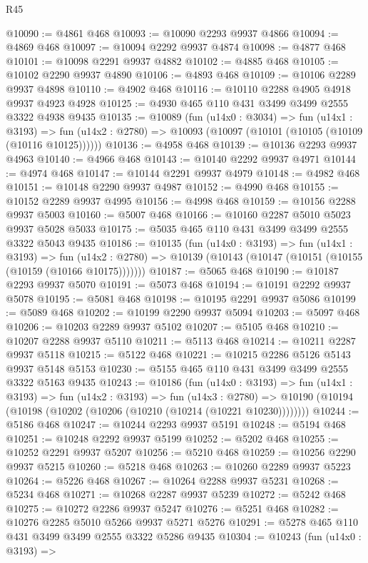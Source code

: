 \begin{lexlean}{R45}
\begin{coremodule}
@10090 := @4861 @468
@10093 := @10090 @2293 @9937 @4866
@10094 := @4869 @468
@10097 := @10094 @2292 @9937 @4874
@10098 := @4877 @468
@10101 := @10098 @2291 @9937 @4882
@10102 := @4885 @468
@10105 := @10102 @2290 @9937 @4890
@10106 := @4893 @468
@10109 := @10106 @2289 @9937 @4898
@10110 := @4902 @468
@10116 := @10110 @2288 @4905 @4918 @9937 @4923 @4928
@10125 := @4930 @465 @110 @431 @3499 @3499 @2555 @3322 @4938 @9435
@10135 := @10089
    (fun (u14x0 : @3034) =>
    fun (u14x1 : @3193) =>
    fun (u14x2 : @2780) => @10093 (@10097 (@10101 (@10105 (@10109 (@10116 @10125))))))
@10136 := @4958 @468
@10139 := @10136 @2293 @9937 @4963
@10140 := @4966 @468
@10143 := @10140 @2292 @9937 @4971
@10144 := @4974 @468
@10147 := @10144 @2291 @9937 @4979
@10148 := @4982 @468
@10151 := @10148 @2290 @9937 @4987
@10152 := @4990 @468
@10155 := @10152 @2289 @9937 @4995
@10156 := @4998 @468
@10159 := @10156 @2288 @9937 @5003
@10160 := @5007 @468
@10166 := @10160 @2287 @5010 @5023 @9937 @5028 @5033
@10175 := @5035 @465 @110 @431 @3499 @3499 @2555 @3322 @5043 @9435
@10186 := @10135
    (fun (u14x0 : @3193) =>
    fun (u14x1 : @3193) =>
    fun (u14x2 : @2780) => @10139 (@10143 (@10147 (@10151 (@10155 (@10159 (@10166 @10175)))))))
@10187 := @5065 @468
@10190 := @10187 @2293 @9937 @5070
@10191 := @5073 @468
@10194 := @10191 @2292 @9937 @5078
@10195 := @5081 @468
@10198 := @10195 @2291 @9937 @5086
@10199 := @5089 @468
@10202 := @10199 @2290 @9937 @5094
@10203 := @5097 @468
@10206 := @10203 @2289 @9937 @5102
@10207 := @5105 @468
@10210 := @10207 @2288 @9937 @5110
@10211 := @5113 @468
@10214 := @10211 @2287 @9937 @5118
@10215 := @5122 @468
@10221 := @10215 @2286 @5126 @5143 @9937 @5148 @5153
@10230 := @5155 @465 @110 @431 @3499 @3499 @2555 @3322 @5163 @9435
@10243 := @10186
    (fun (u14x0 : @3193) =>
    fun (u14x1 : @3193) =>
    fun (u14x2 : @3193) =>
    fun (u14x3 : @2780) =>
    @10190 (@10194 (@10198 (@10202 (@10206 (@10210 (@10214 (@10221 @10230))))))))
@10244 := @5186 @468
@10247 := @10244 @2293 @9937 @5191
@10248 := @5194 @468
@10251 := @10248 @2292 @9937 @5199
@10252 := @5202 @468
@10255 := @10252 @2291 @9937 @5207
@10256 := @5210 @468
@10259 := @10256 @2290 @9937 @5215
@10260 := @5218 @468
@10263 := @10260 @2289 @9937 @5223
@10264 := @5226 @468
@10267 := @10264 @2288 @9937 @5231
@10268 := @5234 @468
@10271 := @10268 @2287 @9937 @5239
@10272 := @5242 @468
@10275 := @10272 @2286 @9937 @5247
@10276 := @5251 @468
@10282 := @10276 @2285 @5010 @5266 @9937 @5271 @5276
@10291 := @5278 @465 @110 @431 @3499 @3499 @2555 @3322 @5286 @9435
@10304 := @10243
    (fun (u14x0 : @3193) =>

\end{coremodule}
\end{lexlean}
